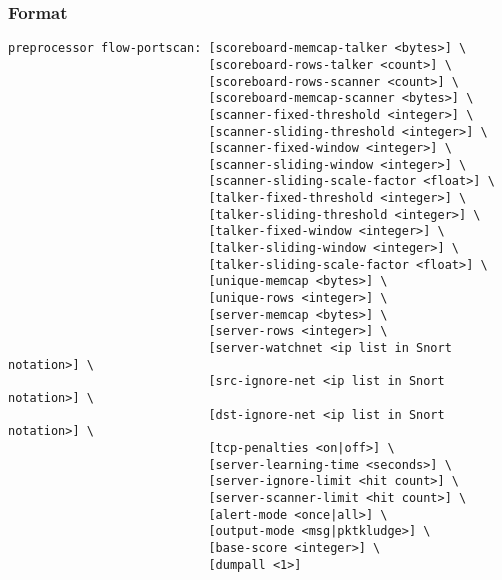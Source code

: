 \documentclass[english]{report}
\begin{document}
\subsubsection{Format}
\begin{verbatim}
preprocessor flow-portscan: [scoreboard-memcap-talker <bytes>] \
                            [scoreboard-rows-talker <count>] \ 
                            [scoreboard-rows-scanner <count>] \
                            [scoreboard-memcap-scanner <bytes>] \
                            [scanner-fixed-threshold <integer>] \
                            [scanner-sliding-threshold <integer>] \
                            [scanner-fixed-window <integer>] \
                            [scanner-sliding-window <integer>] \
                            [scanner-sliding-scale-factor <float>] \
                            [talker-fixed-threshold <integer>] \
                            [talker-sliding-threshold <integer>] \
                            [talker-fixed-window <integer>] \
                            [talker-sliding-window <integer>] \
                            [talker-sliding-scale-factor <float>] \
                            [unique-memcap <bytes>] \
                            [unique-rows <integer>] \
                            [server-memcap <bytes>] \
                            [server-rows <integer>] \
                            [server-watchnet <ip list in Snort notation>] \
                            [src-ignore-net <ip list in Snort notation>] \
                            [dst-ignore-net <ip list in Snort notation>] \
                            [tcp-penalties <on|off>] \
                            [server-learning-time <seconds>] \
                            [server-ignore-limit <hit count>] \
                            [server-scanner-limit <hit count>] \
                            [alert-mode <once|all>] \
                            [output-mode <msg|pktkludge>] \
                            [base-score <integer>] \
                            [dumpall <1>]    

\end{verbatim}
\end{document}
